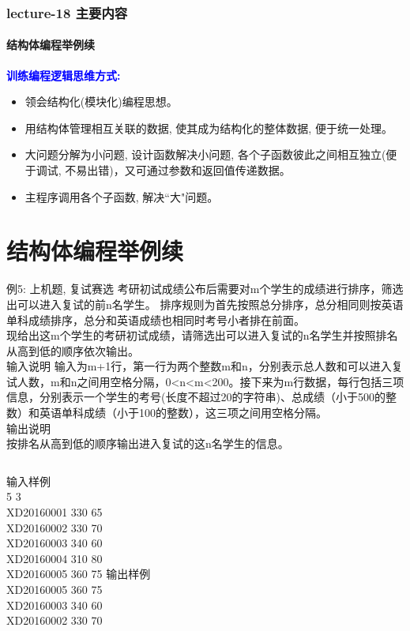 \begin{frame}[shrink]
\frametitle{lecture-18 主要内容}
\framesubtitle{结构体编程举例续}
\tableofcontents
\medskip
\textbf{\textcolor{blue}{训练编程逻辑思维方式:}}
\begin{itemize}
	\item 领会结构化(模块化)编程思想。 
	\item 用结构体管理相互关联的数据, 使其成为结构化的整体数据, 便于统一处理。 
	\item 大问题分解为小问题, 设计函数解决小问题, 各个子函数彼此之间相互独立(便于调试, 不易出错)，又可通过参数和返回值传递数据。
	\item 主程序调用各个子函数, 解决``大"问题。
\end{itemize}
\end{frame}

\section{结构体编程举例续}

\begin{frame}{例5: 上机题, 复试赛选}
考研初试成绩公布后需要对m个学生的成绩进行排序，筛选出可以进入复试的前n名学生。
排序规则为首先按照总分排序，总分相同则按英语单科成绩排序，总分和英语成绩也相同时考号小者排在前面。\\
现给出这m个学生的考研初试成绩，请筛选出可以进入复试的n名学生并按照排名从高到低的顺序依次输出。\\
输入说明	
输入为m+1行，第一行为两个整数m和n，分别表示总人数和可以进入复试人数，m和n之间用空格分隔，0<n<m<200。接下来为m行数据，每行包括三项信息，分别表示一个学生的考号(长度不超过20的字符串)、总成绩（小于500的整数）和英语单科成绩（小于100的整数），这三项之间用空格分隔。\\
输出说明\\	
按排名从高到低的顺序输出进入复试的这n名学生的信息。\\
\begin{columns}[T]
输入样例\\	
5 3\\
XD20160001 330 65\\
XD20160002 330 70\\
XD20160003 340 60\\
XD20160004 310 80\\
XD20160005 360 75
输出样例\\	
XD20160005 360 75\\
XD20160003 340 60\\
XD20160002 330 70
\end{columns}
\medskip
\end{frame}

